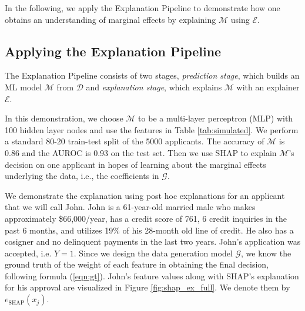 \documentclass[mnsc,blindrev]{informs3}
\begin{document}
   In the following, we apply the Explanation Pipeline to demonstrate how one obtains an understanding of marginal effects by explaining $\mathcal{M}$ using $\mathcal{E}$. %


\subsection{Applying the Explanation Pipeline}
\label{sec:applying_to_simulated}
The Explanation Pipeline consists of two stages, \emph{prediction stage}, which builds an ML model $\mathcal{M}$ from $\mathcal{D}$ and \emph{explanation stage}, which explains $\mathcal{M}$ with an explainer $\mathcal{E}$.

In this demonstration, we choose $\mathcal{M}$ to be a multi-layer perceptron (MLP) with 100 hidden layer nodes and use the features in Table \ref{tab:simulated}. We perform a standard 80-20 train-test split of the 5000 applicants. The accuracy of $\mathcal{M}$ is 0.86 and the AUROC is 0.93 on the test set. %
Then we use SHAP to explain $\mathcal{M}$'s decision on one applicant in hopes of learning about the marginal effects underlying the data, i.e., the coefficients in $\mathcal{G}$.%

We demonstrate the explanation using post hoc explanations for an applicant that we will call John. John is a 61-year-old married male who makes approximately \$66,000/year, has a credit score of 761, 6 credit inquiries in the past 6 months, and utilizes 19\% of his 28-month old line of credit. He also has a cosigner and no delinquent payments in the last two years. John's application was accepted, i.e. $Y = 1$. Since we design the data generation model $\mathcal{G}$, we know the ground truth of the weight of each feature in obtaining the final decision, following formula (\ref{eqn:gt}). John's feature values along with SHAP's explanation for his approval are visualized in Figure \ref{fig:shap_ex_full}. We denote them by $e_\text{SHAP}(x_j)$. %
\end{document}
